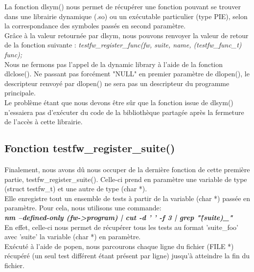 \documentclass[12pt]{article}
\begin{document}
La fonction dlsym() nous permet de récupérer une fonction pouvant se trouver dans une librairie dynamique (.so) ou un exécutable particulier (type PIE), selon la correspondance des symboles passés en second paramètre.\\

Grâce à la valeur retournée par dlsym, nous pouvons renvoyer la valeur de retour de la fonction suivante :
\textit{testfw\_register\_func(fw, suite, name, (testfw\_func\_t) func);}\\

Nous ne fermons pas l'appel de la dynamic library à l'aide de la fonction dlclose().
Ne passant pas forcément "NULL" en premier paramètre de dlopen(), le descripteur renvoyé par dlopen() ne sera pas un descripteur du programme principale.\\

Le problème étant que nous devons être sûr que la fonction issue de dlsym() n'essaiera pas d'exécuter du code de la bibliothèque partagée après la fermeture de l'accès à cette librairie.

\newpage
\subsection{Fonction testfw\_register\_suite()}

\paragraph{}
Finalement, nous avons dû nous occuper de la dernière fonction de cette première partie, testfw\_register\_suite(). Celle-ci prend en paramètre  une variable de type (struct testfw\_t) et une autre de type (char *).\\

Elle enregistre tout un ensemble de tests à partir de la variable (char *) passée en paramètre. Pour cela, nous utilisons une commande:\\

\textbf{\textit{nm --defined-only (fw->program) | cut -d ' ' -f 3 | grep "\^(suite)\_"}}\\

En effet, celle-ci nous permet de récupérer tous les tests au format 'suite\_foo' avec 'suite' la variable (char *) en paramètre.\\

Exécuté à l'aide de popen, nous parcourons chaque ligne du fichier (FILE *) récupéré (un seul test différent étant présent par ligne) jusqu'à atteindre la fin du fichier.\\
\end{document}
